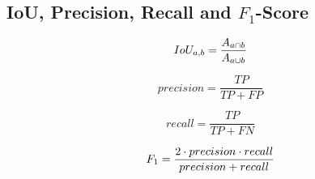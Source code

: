 \documentclass[11pt]{article}
\begin{document}
\subsection{IoU, Precision, Recall and $F_1$-Score}

\begin{minipage}{.19\linewidth}
\begin{equation}
\centering
IoU_{a,b} = \frac{A_{a \cap b}}{A_{a \cup b}}
\end{equation}
\end{minipage} 
\begin{minipage}{.26\linewidth}
\begin{equation}
precision = \frac{TP}{TP + FP}
\end{equation}
\end{minipage}
\begin{minipage}{.23\linewidth}
\begin{equation}
recall = \frac{TP}{TP + FN}
\end{equation}
\end{minipage}
\begin{minipage}{.3\linewidth}
\begin{equation}
\centering
F_1 = \frac{2 \cdot precision \cdot recall}{precision + recall}
\end{equation}
\end{minipage}
\\ [2ex]
\end{document}
